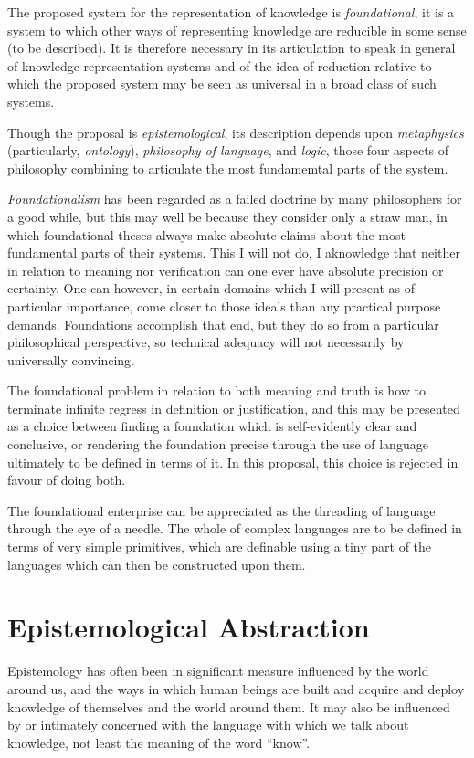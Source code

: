 The proposed system for the representation of knowledge is \emph{foundational}, it is a system to which other ways of representing knowledge are reducible in some sense (to be described).
It is therefore necessary in its articulation to speak in general of knowledge representation systems and of the idea of reduction relative to which the proposed system may be seen as universal in a broad class of such systems.

Though the proposal is \emph{epistemological}, its description depends upon \emph{metaphysics} (particularly, \emph{ontology}), \emph{philosophy of language}, and \emph{logic}, those four aspects of philosophy combining to articulate the most fundamemtal parts of the system.

\emph{Foundationalism} has been regarded as a failed doctrine by many philosophers for a good while, but this may well be because they consider only a straw man, in which foundational theses always make absolute claims about the most fundamental parts of their systems.
This I will not do, I aknowledge that neither in relation to meaning nor verification can one ever have absolute precision or certainty.
One can however, in certain domains which I will present as of particular importance, come closer to those ideals than any practical purpose demands.
Foundations accomplish that end, but they do so from a particular philosophical perspective, so technical adequacy will not necessarily by universally convincing.

The foundational problem in relation to both meaning and truth is how to terminate infinite regress in definition or justification, and this may be presented as a choice between finding a foundation which is self-evidently clear and conclusive, or rendering the foundation precise through the use of language ultimately to be defined in terms of it.
In this proposal, this choice is rejected in favour of doing both.

The foundational enterprise can be appreciated as the threading of language through the eye of a needle.
The whole of complex languages are to be defined in terms of very simple primitives, which are definable using a tiny part of the languages which can then be constructed upon them.

\section{Epistemological Abstraction}

Epistemology has often been in significant measure influenced by the world around us, and the ways in which human beings are built and acquire and deploy knowledge of themselves and the world around them.
It may also be influenced by or intimately concerned with the language with which we talk about knowledge, not least the meaning of the word ``know''.

